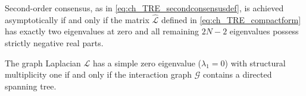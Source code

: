\begin{lemma}\label{lem:ch_TRE_renzeroeig}
Second-order consensus, as in \eqref{eq:ch_TRE_secondconsensusdef}, is achieved asymptotically if and only if the matrix $\hat{\mathcal{L}}$ defined in \eqref{eq:ch_TRE_compactform} has exactly two eigenvalues at zero and all remaining $2N-2$ eigenvalues possess strictly negative real parts.
\end{lemma}

\begin{lemma}\label{lem:ch_TRE_spanningtree}
The graph Laplacian $\mathcal{L}$ has a simple zero eigenvalue ($\lambda_1 = 0$) with structural multiplicity one if and only if the interaction graph $\mathcal{G}$ contains a directed spanning tree.
\end{lemma}

